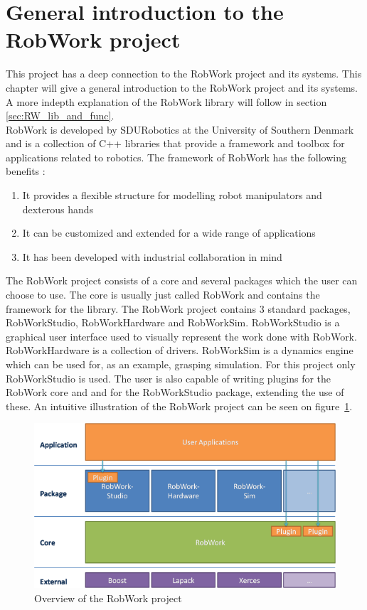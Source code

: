\section{General introduction to the RobWork project}
\label{sec:generalIntroductionToTheRobWorkProject}
This project has a deep connection to the RobWork project and its systems. This chapter will give a general introduction to the RobWork project and its systems. A more indepth explanation of the RobWork library will follow in section \ref{sec:RW_lib_and_func}.\\

RobWork is developed by SDURobotics at the University of Southern Denmark and is a collection of C++ libraries \cite{RW_Webpage} that provide a framework and toolbox for applications related to robotics. The framework of RobWork has the following benefits \cite{RW_Toolbox_Framework}:

\begin{enumerate}
	\item It provides a flexible structure for modelling robot manipulators and dexterous hands
	\item It can be customized and extended for a wide range of applications
	\item It has been developed with industrial collaboration in mind
\end{enumerate}

The RobWork project consists of a core and several packages which the user can choose to use. The core is usually just called RobWork and contains the framework for the library. The RobWork project contains 3 standard packages, RobWorkStudio, RobWorkHardware and RobWorkSim. RobWorkStudio is a graphical user interface used to visually represent the work done with RobWork. RobWorkHardware is a collection of drivers. RobWorkSim is a dynamics engine which can be used for, as an example, grasping simulation. For this project only RobWorkStudio is used. The user is also capable of writing plugins for the RobWork core and and for the RobWorkStudio package, extending the use of these. An intuitive illustration of the RobWork project can be seen on figure~\ref{fig:RWOverview}.

\begin{figure}[h]
	\centering
	\includegraphics[scale=1]{Figures/RWOverview.png}
	\caption{Overview of the RobWork project \cite{RW_Overview}}
	\label{fig:RWOverview}
\end{figure}